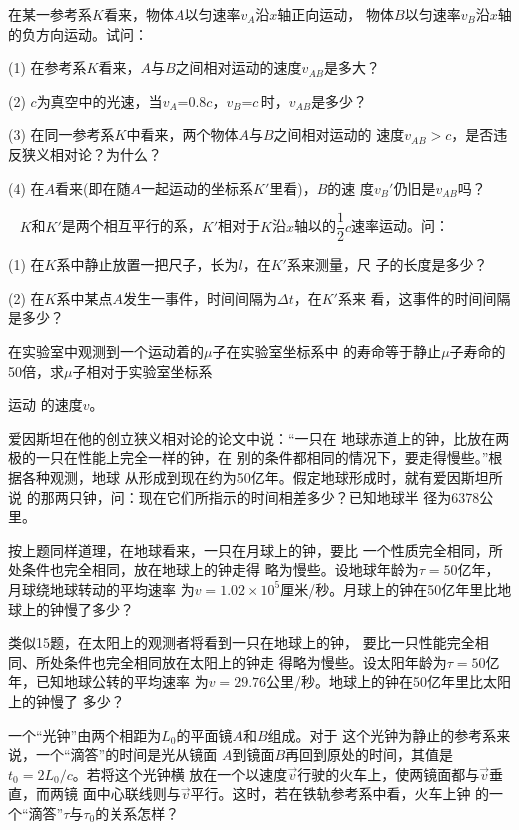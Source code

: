 \exercise 在某一参考系$K$看来，物体$A$以匀速率$v_A$沿$x$轴正向运动，
物体$B$以匀速率$v_B$沿$x$轴的负方向运动。试问：

(1) 在参考系\*$K$\*看来，\!$A$\*与\*$B$\*之间相对运动的速度\*$v_{A\!B}$\*是多大？

(2) $c$\*为真空中的光速，当\*$ v _ { A }$=0.8$ c $，\!$ v _ { B }$=$ c  $\,时，\!$v_{A\!B}$\*是多少？

(3) 在同一参考系$K$中看来，两个物体$A$与$B$之间相对运动的
速度$ v _ { A B } > c  $，是否违反狭义相对论？为什么？

(4) 在$A$看来(即在随$A$一起运动的坐标系$K'$里看)，$B$的速
度$ v _ B ' $仍旧是$v_{AB}$吗？

\exercise~ $K$和$K'$是两个相互平行的系，$K'$相对于$K$沿$x$轴以的$\dfrac { 1 } { 2 } c $速率运动。问：

(1) 在$K$系中静止放置一把尺子，长为$l$，在$K'$系来测量，尺
子的长度是多少？

(2) 在$K$系中某点$A$发生一事件，时间间隔为$\Delta t$，在$K'$系来
看，这事件的时间间隔是多少？

\exercise 在实验室中观测到一个运动着的$\mu$子在实验室坐标系中
的寿命等于静止$\mu$子寿命的50倍，求$\mu$子相对于实验室坐标系
\clearpage

\noindent 运动
的速度$v$。

\exercise 爱因斯坦在他的创立狭义相对论的论文中说：“一只在
地球赤道上的钟，比放在两极的一只在性能上完全一样的钟，在
别的条件都相同的情况下，要走得慢些。”根据各种观测，地球
从形成到现在约为50亿年。假定地球形成时，就有爱因斯坦所说
的那两只钟，问：现在它们所指示的时间相差多少？已知地球半
径为6378公里。\vspace{-0.14em}

\exercise 按上题同样道理，在地球看来，一只在月球上的钟，要比
一个性质完全相同，所处条件也完全相同，放在地球上的钟走得
略为慢些。设地球年龄为$ \tau = 5 0  $亿年，月球绕地球转动的平均速率
为$ v = 1 . 0 2 \times 1 0 ^ { 5 }  $厘米/秒。月球上的钟在50亿年里比地球上的钟慢了多少？\vspace{-0.14em}

\exercise 类似15题，在太阳上的观测者将看到一只在地球上的钟，
要比一只性能完全相同、所处条件也完全相同放在太阳上的钟走
得略为慢些。设太阳年龄为$ \tau = 5 0  $亿年，已知地球公转的平均速率
为$ v = 2 9 . 7 6  $公里/秒。地球上的钟在50亿年里比太阳上的钟慢了
多少？\vspace{-0.14em}

\exercise 一个“光钟”由两个相距为$ L _ { 0 }  $的平面镜$A$和$B$组成。对于
这个光钟为静止的参考系来说，一个“滴答”的时间是光从镜面
$A$到镜面$B$再回到原处的时间，其值是$ t _ { 0 } = 2 L _ { 0 }  /c$。若将这个光钟横
放在一个以速度$\vec{v}$行驶的火车上，使两镜面都与$\vec{v}$垂直，而两镜
面中心联线则与$\vec{v}$平行。这时，若在铁轨参考系中看，火车上钟
的一个“滴答”$\tau$与$\tau _ 0$的关系怎样？\vspace{-0.14em}

